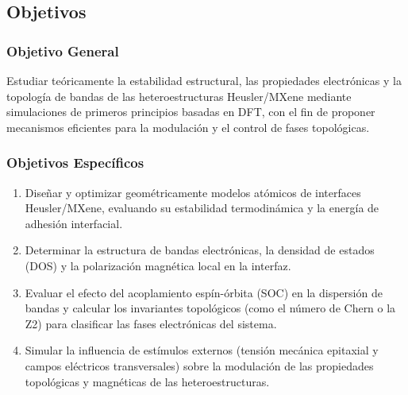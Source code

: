 \subsection{Objetivos}

\subsubsection{Objetivo General}
Estudiar teóricamente la estabilidad estructural, las propiedades electrónicas y la topología de bandas de las heteroestructuras Heusler/MXene mediante simulaciones de primeros principios basadas en DFT, con el fin de proponer mecanismos eficientes para la modulación y el control de fases topológicas.

\subsubsection{Objetivos Específicos}
\begin{enumerate}
    \item Diseñar y optimizar geométricamente modelos atómicos de interfaces Heusler/MXene, evaluando su estabilidad termodinámica y la energía de adhesión interfacial.
    \item Determinar la estructura de bandas electrónicas, la densidad de estados (DOS) y la polarización magnética local en la interfaz.
    \item Evaluar el efecto del acoplamiento espín-órbita (SOC) en la dispersión de bandas y calcular los invariantes topológicos (como el número de Chern o la Z2) para clasificar las fases electrónicas del sistema.
    \item Simular la influencia de estímulos externos (tensión mecánica epitaxial y campos eléctricos transversales) sobre la modulación de las propiedades topológicas y magnéticas de las heteroestructuras.
\end{enumerate}
